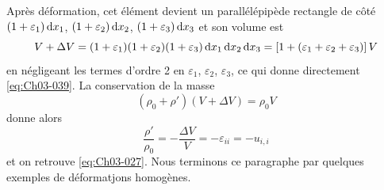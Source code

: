 Après déformation, cet élément devient un parallélépipède rectangle de côté $(1+\varepsilon_1)\mathop{\mathrm{{}d}}\mathopen{} x_1$, $(1+\varepsilon_2)\mathop{\mathrm{{}d}}\mathopen{} x_2$, $(1+\varepsilon_3)\mathop{\mathrm{{}d}}\mathopen{} x_3$ et son volume est
\begin{equation}
    V+\Delta V = (1+\varepsilon_1)(1+\varepsilon_2)(1+\varepsilon_3)\mathop{\mathrm{{}d}}\mathopen{} x_1 \mathop{\mathrm{{}d}}\mathopen{} x_2 \mathop{\mathrm{{}d}}\mathopen{} x_3 = \left[ 1 + \left( \varepsilon_1 + \varepsilon_2 + \varepsilon_3 \right) \right] V
\end{equation}
en négligeant les termes d'ordre 2 en $\varepsilon_1$, $\varepsilon_2$, $\varepsilon_3$, ce qui donne directement \eqref{eq:Ch03-039}.
La conservation de la masse
\begin{equation*}
    \left( \rho_0 + \rho' \right) \left( V + \Delta V \right) = \rho_0 V
\end{equation*}
donne alors
\begin{equation}
    \frac{\rho'}{\rho_0} = - \frac{\Delta V}{V} = - \varepsilon_{ii} = - u_{i,i}
    \label{eq:Ch03-040}
\end{equation}
et on retrouve \eqref{eq:Ch03-027}.
Nous terminons ce paragraphe par quelques exemples de déformatjons homogènes.

